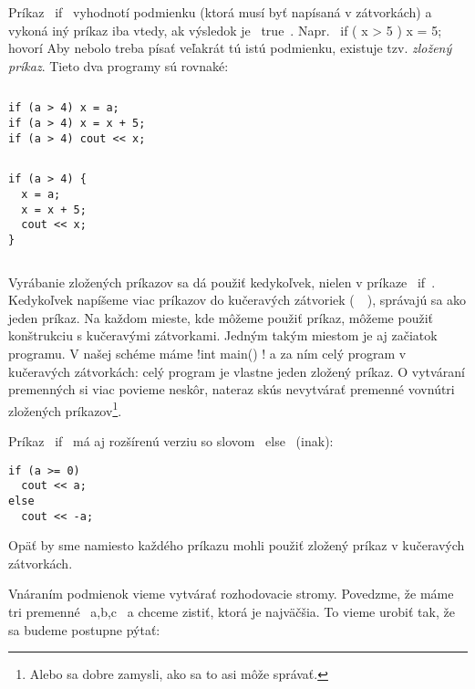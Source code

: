 Príkaz \prg~if~ vyhodnotí podmienku (ktorá musí byť napísaná v zátvorkách)
a vykoná iný príkaz iba vtedy, ak výsledok je \prg~true~.
Napr. \prg~if ( x > 5 ) x = 5;~ hovorí  Aby nebolo treba písať veľakrát tú istú 
podmienku, existuje tzv. {\em zložený príkaz}. 
Tieto dva programy
sú rovnaké:

\begin{column}{0.45}
\begin{lstlisting}
if (a > 4) x = a;
if (a > 4) x = x + 5;
if (a > 4) cout << x;
\end{lstlisting}
\end{column}
\hfill
\begin{column}{0.45}
\begin{lstlisting}
if (a > 4) {
  x = a;
  x = x + 5;
  cout << x;
}
\end{lstlisting}
\end{column}

Vyrábanie zložených príkazov sa dá použiť kedykoľvek, nielen v príkaze \prg~if~.
Kedykoľvek napíšeme viac príkazov
do kučeravých zátvoriek (\prg~{}~), správajú sa ako jeden príkaz. 
Na každom mieste, kde môžeme použiť príkaz, môžeme 
použiť konštrukciu s kučeravými zátvorkami. Jedným takým miestom je aj začiatok programu.
V našej schéme máme \prg!int main() ! a za ním celý program v kučeravých zátvorkách:
celý program je vlastne jeden zložený príkaz. O vytváraní premenných si viac povieme neskôr,
nateraz skús nevytvárať premenné vovnútri zložených príkazov\footnote{Alebo sa dobre zamysli,
ako sa to asi môže správať.}.

Príkaz \prg~if~ má aj rozšírenú verziu so slovom \prg~else~ (inak):

\begin{lstlisting}
if (a >= 0)
  cout << a;
else
  cout << -a;
\end{lstlisting}

Opäť by sme namiesto každého príkazu mohli použiť zložený príkaz v kučeravých zátvorkách.

Vnáraním podmienok vieme vytvárať rozhodovacie stromy. Povedzme, že máme tri premenné
\prg~a,b,c~ a chceme zistiť, ktorá je najväčšia. To vieme urobiť tak, že sa budeme 
postupne pýtať:\\

